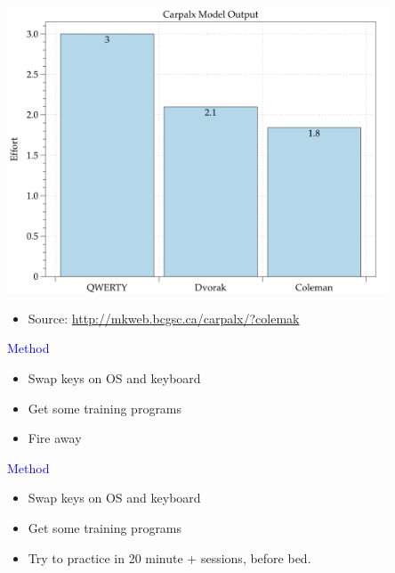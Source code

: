 \documentclass[landscape]{slides}
\begin{document}
\begin{slide}

    \centering

    \includegraphics[width=0.85\textwidth]{keyboards}

    \begin{itemize}
        \item Source: \url{http://mkweb.bcgsc.ca/carpalx/?colemak}
    \end{itemize}

\end{slide}


\begin{slide}

    \textcolor{blue}{\Large{Method}}

    \begin{itemize}
        \item Swap keys on OS and keyboard
        \item Get some training programs
        \item Fire away
    \end{itemize}

\end{slide}


\begin{slide}

    \textcolor{blue}{\Large{Method}}

    \begin{itemize}
        \item Swap keys on OS and keyboard
        \item Get some training programs
        \item Try to practice in 20 minute + sessions, before bed.
    \end{itemize}

\end{slide}
\end{document}
